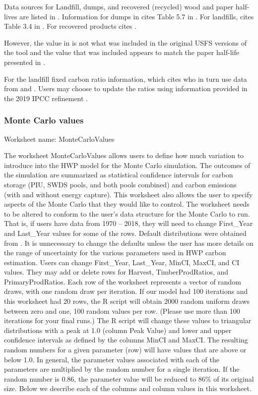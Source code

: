 \documentclass[
  openany]{book}
\begin{document}
Data sources for Landfill, dumps, and recovered (recycled) wood and paper half-lives are listed in \textcite{skog2008}. Information for dumps in \textcite{skog2008} cites Table 5.7 in \textcite{penman2000}. For landfills, \textcite{skog2008} cites Table 3.4 in \textcite{buendia2019}. For recovered products \textcite{skog2008} cites \textcite{pingoud2006}.

However, the value in \textcite{pingoud2006} is not what was included in the original USFS versions of the tool and the value that was included appears to match the paper half-life presented in \textcite{smith2006}.

For the landfill fixed carbon ratio information, \textcite{skog2008} which cites \textcite{freed2003} who in turn use data from \textcite{barlaz1998} and \textcite{eleazer1997}. Users may choose to update the ratios using information provided in the 2019 IPCC refinement \autocite{ruter2019}.

\hypertarget{own-prov-input-mc}{%
\subsubsection{Monte Carlo values}\label{own-prov-input-mc}}

Worksheet name: MonteCarloValues

The worksheet MonteCarloValues allows users to define how much variation to introduce into the HWP model for the Monte Carlo simulation. The outcomes of the simulation are summarized as statistical confidence intervals for carbon storage (PIU, SWDS pools, and both pools combined) and carbon emissions (with and without energy capture). This worksheet also allows the user to specify aspects of the Monte Carlo that they would like to control. The worksheet needs to be altered to conform to the user's data structure for the Monte Carlo to run. That is, if users have data from 1970 -- 2018, they will need to change First\_Year and Last\_Year values for some of the rows. Default distributions were obtained from \textcite{stockmann2012}. It is unnecessary to change the defaults unless the user has more details on the range of uncertainty for the various parameters used in HWP carbon estimation. Users can change First\_Year, Last\_Year, MinCI, MaxCI, and CI values. They may add or delete rows for Harvest, TimberProdRatios, and PrimaryProdRatios. Each row of the worksheet represents a vector of random draws, with one random draw per iteration. If our model had 100 iterations and this worksheet had 20 rows, the R script will obtain 2000 random uniform draws between zero and one, 100 random values per row. (Please use more than 100 iterations for your final runs.) The R script will change these values to triangular distributions with a peak at 1.0 (column Peak Value) and lower and upper confidence intervals as defined by the columns MinCI and MaxCI. The resulting random numbers for a given parameter (row) will have values that are above or below 1.0. In general, the parameter values associated with each of the parameters are multiplied by the random number for a single iteration. If the random number is 0.86, the parameter value will be reduced to 86\% of its original size. Below we describe each of the columns and column values in this worksheet.
\end{document}
